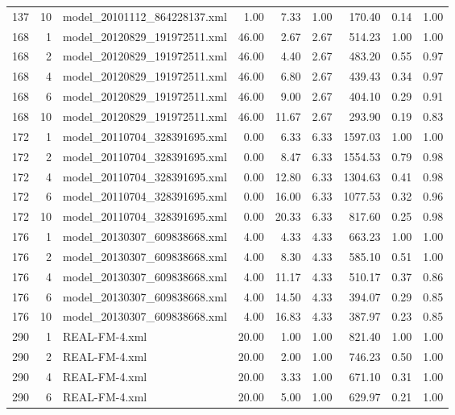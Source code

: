\begin{table}[ht]
\begin{tabular}{rrlrrrrrr}
  137 &  10 & model\_20101112\_864228137.xml & 1.00 & 7.33 & 1.00 & 170.40 & 0.14 & 1.00 \\ 
  168 &   1 & model\_20120829\_191972511.xml & 46.00 & 2.67 & 2.67 & 514.23 & 1.00 & 1.00 \\ 
  168 &   2 & model\_20120829\_191972511.xml & 46.00 & 4.40 & 2.67 & 483.20 & 0.55 & 0.97 \\ 
  168 &   4 & model\_20120829\_191972511.xml & 46.00 & 6.80 & 2.67 & 439.43 & 0.34 & 0.97 \\ 
  168 &   6 & model\_20120829\_191972511.xml & 46.00 & 9.00 & 2.67 & 404.10 & 0.29 & 0.91 \\ 
  168 &  10 & model\_20120829\_191972511.xml & 46.00 & 11.67 & 2.67 & 293.90 & 0.19 & 0.83 \\ 
  172 &   1 & model\_20110704\_328391695.xml & 0.00 & 6.33 & 6.33 & 1597.03 & 1.00 & 1.00 \\ 
  172 &   2 & model\_20110704\_328391695.xml & 0.00 & 8.47 & 6.33 & 1554.53 & 0.79 & 0.98 \\ 
  172 &   4 & model\_20110704\_328391695.xml & 0.00 & 12.80 & 6.33 & 1304.63 & 0.41 & 0.98 \\ 
  172 &   6 & model\_20110704\_328391695.xml & 0.00 & 16.00 & 6.33 & 1077.53 & 0.32 & 0.96 \\ 
  172 &  10 & model\_20110704\_328391695.xml & 0.00 & 20.33 & 6.33 & 817.60 & 0.25 & 0.98 \\ 
  176 &   1 & model\_20130307\_609838668.xml & 4.00 & 4.33 & 4.33 & 663.23 & 1.00 & 1.00 \\ 
  176 &   2 & model\_20130307\_609838668.xml & 4.00 & 8.30 & 4.33 & 585.10 & 0.51 & 1.00 \\ 
  176 &   4 & model\_20130307\_609838668.xml & 4.00 & 11.17 & 4.33 & 510.17 & 0.37 & 0.86 \\ 
  176 &   6 & model\_20130307\_609838668.xml & 4.00 & 14.50 & 4.33 & 394.07 & 0.29 & 0.85 \\ 
  176 &  10 & model\_20130307\_609838668.xml & 4.00 & 16.83 & 4.33 & 387.97 & 0.23 & 0.85 \\ 
  290 &   1 & REAL-FM-4.xml & 20.00 & 1.00 & 1.00 & 821.40 & 1.00 & 1.00 \\ 
  290 &   2 & REAL-FM-4.xml & 20.00 & 2.00 & 1.00 & 746.23 & 0.50 & 1.00 \\ 
  290 &   4 & REAL-FM-4.xml & 20.00 & 3.33 & 1.00 & 671.10 & 0.31 & 1.00 \\ 
  290 &   6 & REAL-FM-4.xml & 20.00 & 5.00 & 1.00 & 629.97 & 0.21 & 1.00 \\ 

\end{tabular}
\end{table}
